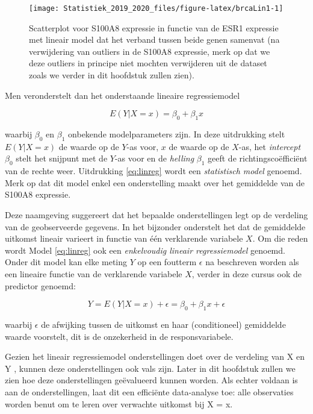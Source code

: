 \documentclass[12pt,dutch,coursenotes]{book}
\theoremstyle{definition}
\theoremstyle{definition}
\theoremstyle{definition}
\theoremstyle{remark}
\begin{document}
\begin{figure}

{\centering \texttt{[image: Statistiek\_2019\_2020\_files/figure-latex/brcaLin1-1]} 

}

\caption{Scatterplot voor S100A8 expressie in functie van de ESR1 expressie met lineair model dat het verband tussen beide genen samenvat (na verwijdering van outliers in de S100A8 expressie, merk op dat we deze outliers in principe niet mochten verwijderen uit de dataset zoals we verder in dit hoofdstuk zullen zien).}\label{fig:brcaLin1}
\end{figure}

Men veronderstelt dan het onderstaande lineaire regressiemodel

\begin{equation} 
E(Y|X =x)=\beta_0 + \beta_1 x  \label{eq:linreg}
\end{equation}

waarbij \(\beta_0\) en \(\beta_1\) onbekende modelparameters zijn. In
deze uitdrukking stelt \(E(Y|X=x)\) de waarde op de \(Y\)-as voor, \(x\)
de waarde op de \(X\)-as, het \emph{intercept} \(\beta_0\) stelt het
snijpunt met de \(Y\)-as voor en de \emph{helling} \(\beta_1\) geeft de
richtingscoëfficiënt van de rechte weer. Uitdrukking \eqref{eq:linreg}
wordt een \emph{statistisch model} genoemd. Merk op dat dit model enkel
een onderstelling maakt over het gemiddelde van de S100A8 expressie.

Deze naamgeving suggereert dat het bepaalde onderstellingen legt op de
verdeling van de geobserveerde gegevens. In het bijzonder onderstelt het
dat de gemiddelde uitkomst lineair varieert in functie van één
verklarende variabele \(X\). Om die reden wordt Model \eqref{eq:linreg}
ook een \emph{enkelvoudig lineair regressiemodel} genoemd. Onder dit
model kan elke meting \(Y\) op een foutterm \(\epsilon\) na beschreven
worden als een lineaire functie van de verklarende variabele \(X\),
verder in deze cursus ook de predictor genoemd:

\[Y=E(Y|X=x)+\epsilon=\beta_0+\beta_1 x+\epsilon\]

waarbij \(\epsilon\) de afwijking tussen de uitkomst en haar
(conditioneel) gemiddelde waarde voorstelt, dit is de onzekerheid in de
responsvariabele.

Gezien het lineair regressiemodel onderstellingen doet over de verdeling
van X en Y , kunnen deze onderstellingen ook vals zijn. Later in dit
hoofdstuk zullen we zien hoe deze onderstellingen geëvalueerd kunnen
worden. Als echter voldaan is aan de onderstellingen, laat dit een
efficiënte data-analyse toe: alle observaties worden benut om te leren
over verwachte uitkomst bij X = x.
\end{document}
